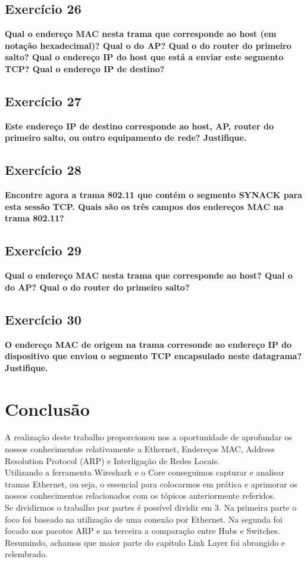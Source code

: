 \documentclass[a4paper]{report}
\begin{document}
\section{Exercício 26}
\textbf{Qual o endereço MAC nesta trama que corresponde ao host (em notação
    hexadecimal)? Qual o do AP? Qual o do router do primeiro salto? Qual o
    endereço IP do host que está a enviar este segmento TCP? Qual o endereço IP
    de destino?}

\section{Exercício 27}
\textbf{Este endereço IP de destino corresponde ao host, AP, router do primeiro
    salto, ou outro equipamento de rede? Justifique.}

\section{Exercício 28}
\textbf{Encontre agora a trama 802.11 que contém o segmento SYNACK para esta
    sessão TCP. Quais são os três campos dos endereços MAC na trama 802.11?}

\section{Exercício 29}
\textbf{Qual o endereço MAC nesta trama que corresponde ao host? Qual o do AP?
    Qual o do router do primeiro salto?}

\section{Exercício 30}
\textbf{O endereço MAC de origem na trama corresonde ao endereço IP do
    dispositivo que enviou o segmento TCP encapsulado neste datagrama?
    Justifique.}

\chapter{Conclusão}
A realização deste trabalho proporcionou nos a oportunidade de aprofundar os
nossos conhecimentos relativamente a Ethernet, Endereços MAC, Address Resolution
Protocol (ARP) e Interligação de Redes Locais.\\
Utilizando a ferramenta Wireshark e o Core conseguimos capturar e analisar
tramas Ethernet, ou seja, o essencial para colocarmos em prática e aprimorar os
nossos conhecimentos relacionados com os tópicos anteriormente referidos.\\
Se dividirmos o trabalho por partes é possível dividir em 3. Na primeira parte o
foco foi baseado na utilização de uma conexão por Ethernet. Na segunda foi
focado nos pacotes ARP e na terceira a comparação entre Hubs e Switches.
Resumindo, achamos que maior parte do capitulo Link Layer foi abrangido e
relembrado.
\end{document}
